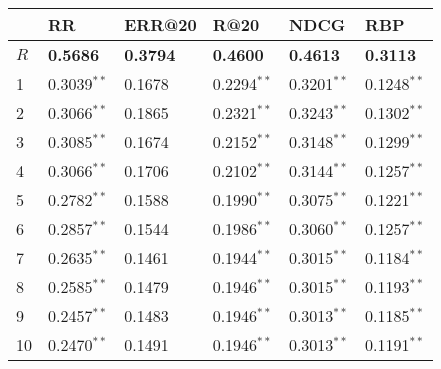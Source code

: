 \begin{tabular}{llllll}
\toprule
{} &               RR &           ERR@20 &           R@20 &             NDCG &              RBP \\
\midrule
$R$ &  \textbf{0.5686} &  \textbf{0.3794} &  \textbf{0.4600} &  \textbf{0.4613} &  \textbf{0.3113} \\
1   &    0.3039$^{**}$ &           0.1678 &  0.2294$^{**}$ &    0.3201$^{**}$ &    0.1248$^{**}$ \\
2   &    0.3066$^{**}$ &           0.1865 &  0.2321$^{**}$ &    0.3243$^{**}$ &    0.1302$^{**}$ \\
3   &    0.3085$^{**}$ &           0.1674 &  0.2152$^{**}$ &    0.3148$^{**}$ &    0.1299$^{**}$ \\
4   &    0.3066$^{**}$ &           0.1706 &  0.2102$^{**}$ &    0.3144$^{**}$ &    0.1257$^{**}$ \\
5   &    0.2782$^{**}$ &           0.1588 &  0.1990$^{**}$ &    0.3075$^{**}$ &    0.1221$^{**}$ \\
6   &    0.2857$^{**}$ &           0.1544 &  0.1986$^{**}$ &    0.3060$^{**}$ &    0.1257$^{**}$ \\
7   &    0.2635$^{**}$ &           0.1461 &  0.1944$^{**}$ &    0.3015$^{**}$ &    0.1184$^{**}$ \\
8   &    0.2585$^{**}$ &           0.1479 &  0.1946$^{**}$ &    0.3015$^{**}$ &    0.1193$^{**}$ \\
9   &    0.2457$^{**}$ &           0.1483 &  0.1946$^{**}$ &    0.3013$^{**}$ &    0.1185$^{**}$ \\
10  &    0.2470$^{**}$ &           0.1491 &  0.1946$^{**}$ &    0.3013$^{**}$ &    0.1191$^{**}$ \\
\bottomrule
\end{tabular}
